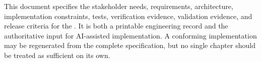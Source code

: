 This document specifies the stakeholder needs, requirements, architecture,
implementation constraints, tests, verification evidence, validation evidence,
and release criteria for the \ProjectName. It is both a printable engineering
record and the authoritative input for AI-assisted implementation. A conforming
implementation may be regenerated from the complete specification, but no
single chapter should be treated as sufficient on its own.
